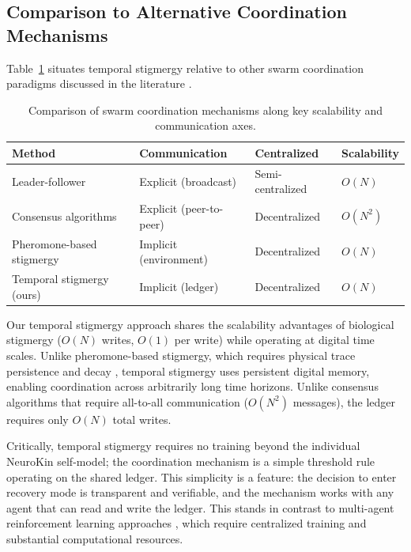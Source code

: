 \documentclass[12pt,a4paper,oneside]{report}
\begin{document}
\subsection{Comparison to Alternative Coordination Mechanisms}
\label{subsec:comparison_to_alternative_coordination_mechanisms}

Table~\ref{tab:coordination_comparison} situates temporal stigmergy relative to other swarm coordination paradigms discussed in the literature \cite{bongard2006resilient, cully2015robots, domberg2026selfadapting}.

\begin{table}[H]
\centering
\small
\setlength{\tabcolsep}{4pt}
\caption{Comparison of swarm coordination mechanisms along key scalability and communication axes.}
\label{tab:coordination_comparison}
\begin{tabular}{>{\raggedright\arraybackslash}p{4.0cm} >{\raggedright\arraybackslash}p{4.0cm} >{\centering\arraybackslash}p{2.6cm} >{\centering\arraybackslash}p{2.6cm}}
\toprule
\textbf{Method} & \textbf{Communication} & \textbf{Centralized} & \textbf{Scalability} \\
\midrule
Leader-follower & Explicit (broadcast) & Semi-centralized & $O(N)$ \\
Consensus algorithms & Explicit (peer-to-peer) & Decentralized & $O(N^2)$ \\
Pheromone-based stigmergy & Implicit (environment) & Decentralized & $O(N)$ \\
Temporal stigmergy (ours) & Implicit (ledger) & Decentralized & $O(N)$ \\
\bottomrule
\end{tabular}
\end{table}

Our temporal stigmergy approach shares the scalability advantages of biological stigmergy ($O(N)$ writes, $O(1)$ per write) while operating at digital time scales. Unlike pheromone-based stigmergy, which requires physical trace persistence and decay \cite{bongard2006resilient}, temporal stigmergy uses persistent digital memory, enabling coordination across arbitrarily long time horizons. Unlike consensus algorithms that require all-to-all communication ($O(N^2)$ messages), the ledger requires only $O(N)$ total writes.

Critically, temporal stigmergy requires no training beyond the individual NeuroKin self-model; the coordination mechanism is a simple threshold rule operating on the shared ledger. This simplicity is a feature: the decision to enter recovery mode is transparent and verifiable, and the mechanism works with any agent that can read and write the ledger. This stands in contrast to multi-agent reinforcement learning approaches \cite{domberg2026selfadapting, daneshmand2026slowrl}, which require centralized training and substantial computational resources.
\end{document}
